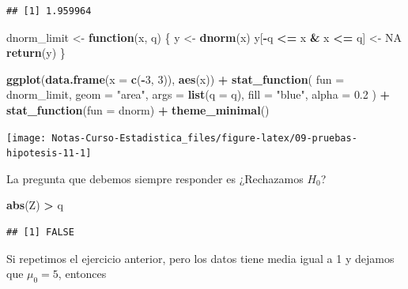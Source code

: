 \documentclass[
  12pt,
]{book}
\newenvironment{Shaded}{\begin{snugshade}}{\end{snugshade}}
\newcommand{\ControlFlowTok}[1]{\textcolor[rgb]{0.13,0.29,0.53}{\textbf{#1}}}
\newcommand{\DataTypeTok}[1]{\textcolor[rgb]{0.13,0.29,0.53}{#1}}
\newcommand{\DecValTok}[1]{\textcolor[rgb]{0.00,0.00,0.81}{#1}}
\newcommand{\FloatTok}[1]{\textcolor[rgb]{0.00,0.00,0.81}{#1}}
\newcommand{\KeywordTok}[1]{\textcolor[rgb]{0.13,0.29,0.53}{\textbf{#1}}}
\newcommand{\NormalTok}[1]{#1}
\newcommand{\OperatorTok}[1]{\textcolor[rgb]{0.81,0.36,0.00}{\textbf{#1}}}
\newcommand{\OtherTok}[1]{\textcolor[rgb]{0.56,0.35,0.01}{#1}}
\newcommand{\StringTok}[1]{\textcolor[rgb]{0.31,0.60,0.02}{#1}}
\begin{document}
\begin{verbatim}
## [1] 1.959964
\end{verbatim}

\begin{Shaded}
\begin{Highlighting}[]
\NormalTok{dnorm\_limit \textless{}{-}}\StringTok{ }\ControlFlowTok{function}\NormalTok{(x, q) \{}
\NormalTok{  y \textless{}{-}}\StringTok{ }\KeywordTok{dnorm}\NormalTok{(x)}
\NormalTok{  y[}\OperatorTok{{-}}\NormalTok{q }\OperatorTok{\textless{}=}\StringTok{ }\NormalTok{x }\OperatorTok{\&}\StringTok{ }\NormalTok{x }\OperatorTok{\textless{}=}\StringTok{ }\NormalTok{q] \textless{}{-}}\StringTok{ }\OtherTok{NA}
  \KeywordTok{return}\NormalTok{(y)}
\NormalTok{\}}

\KeywordTok{ggplot}\NormalTok{(}\KeywordTok{data.frame}\NormalTok{(}\DataTypeTok{x =} \KeywordTok{c}\NormalTok{(}\OperatorTok{{-}}\DecValTok{3}\NormalTok{, }\DecValTok{3}\NormalTok{)), }\KeywordTok{aes}\NormalTok{(x)) }\OperatorTok{+}
\StringTok{  }\KeywordTok{stat\_function}\NormalTok{(}
    \DataTypeTok{fun =}\NormalTok{ dnorm\_limit, }\DataTypeTok{geom =} \StringTok{"area"}\NormalTok{, }\DataTypeTok{args =} \KeywordTok{list}\NormalTok{(}\DataTypeTok{q =}\NormalTok{ q),}
    \DataTypeTok{fill =} \StringTok{"blue"}\NormalTok{, }\DataTypeTok{alpha =} \FloatTok{0.2}
\NormalTok{  ) }\OperatorTok{+}
\StringTok{  }\KeywordTok{stat\_function}\NormalTok{(}\DataTypeTok{fun =}\NormalTok{ dnorm) }\OperatorTok{+}
\StringTok{  }\KeywordTok{theme\_minimal}\NormalTok{()}
\end{Highlighting}
\end{Shaded}

\begin{center}\texttt{[image: Notas-Curso-Estadistica\_files/figure-latex/09-pruebas-hipotesis-11-1]} \end{center}

La pregunta que debemos siempre responder es ¿Rechazamos \(H_0\)?

\begin{Shaded}
\begin{Highlighting}[]
\KeywordTok{abs}\NormalTok{(Z) }\OperatorTok{\textgreater{}}\StringTok{ }\NormalTok{q}
\end{Highlighting}
\end{Shaded}

\begin{verbatim}
## [1] FALSE
\end{verbatim}

Si repetimos el ejercicio anterior, pero los datos tiene media igual a 1 y
dejamos que \(\mu_0 = 5\), entonces
\end{document}
